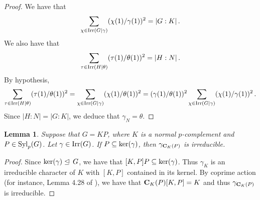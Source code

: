\documentclass[12pt]{amsart}
\theoremstyle{plain}
\newtheorem{lem}[thm]{Lemma}
\theoremstyle{definition}
\numberwithin{equation}{section}
\def\irr#1{{\rm Irr}(#1)}
\def\cent#1#2{{\bf C}_{#1}(#2)}
\def\syl#1#2{{\rm Syl}_#1(#2)}
\def\nor{\trianglelefteq\,}
\def\ker#1{{\rm ker}(#1)}
\def\sbs{\subseteq}
\begin{document}
\begin{proof}
We have that $$\sum_{\chi \in \irr{G|\gamma}}
(\chi(1)/\gamma(1))^2=|G:K|\, .$$ We also have that $$\sum_{\tau \in
\irr{H|\theta}} (\tau(1)/\theta(1))^2=|H:N|\, .$$ By hypothesis,
$$\sum_{\tau \in \irr{H|\theta}} (\tau(1)/\theta(1))^2=
\sum_{\chi \in \irr{G|\gamma}} (\chi(1)/\theta(1))^2=
(\gamma(1)/\theta(1))^2 \sum_{\chi \in \irr{G|\gamma}}
(\chi(1)/\gamma(1))^2 \, .$$ Since $|H:N|=|G:K|$, we deduce that
$\gamma_N=\theta$.     \end{proof}

%
%


\begin{lem}\label{r}
Suppose that $G=KP$, where $K$ is a normal $p$-complement and $P\in
\syl pG$. Let $\gamma \in \irr G$. If $P\sbs \ker\gamma$, then
$\gamma_{\cent KP}$ is irreducible.
\end{lem}

\begin{proof}
Since $\ker\gamma \nor G$, we have that $[K,P]P \sbs \ker\gamma$.
Thus $\gamma_K$ is an irreducible character of $K$ with $[K,P]$
contained in its kernel. By coprime action (for instance, Lemma 4.28 of \cite{Is08}),  we have that $\cent KP[K,P]=K$ and
thus $\gamma_{\cent KP}$ is irreducible.
\end{proof}
\end{document}
